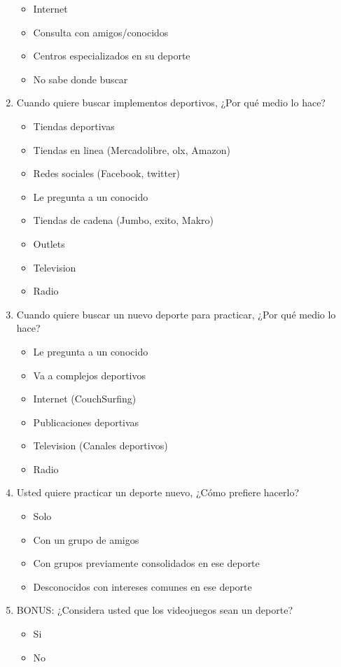 \begin{enumerate}
  \begin{itemize}
    \item Internet
    \item Consulta con amigos/conocidos
    \item Centros especializados en su deporte
    \item No sabe donde buscar
  \end{itemize}
  \item Cuando quiere buscar implementos deportivos, ¿Por qué medio lo hace?
  \begin{itemize}
    \item Tiendas deportivas
    \item Tiendas en linea (Mercadolibre, olx, Amazon)
    \item Redes sociales (Facebook, twitter)
    \item Le pregunta a un conocido
    \item Tiendas de cadena (Jumbo, exito, Makro)
    \item Outlets
    \item Television
    \item Radio
  \end{itemize}
  \item Cuando quiere buscar un nuevo deporte para practicar, ¿Por qué medio lo hace?
  \begin{itemize}
    \item Le pregunta a un conocido
    \item Va a complejos deportivos
    \item Internet (CouchSurfing)
    \item Publicaciones deportivas
    \item Television (Canales deportivos)
    \item Radio
  \end{itemize}
  \item Usted quiere practicar un deporte nuevo, ¿Cómo prefiere hacerlo?
  \begin{itemize}
    \item Solo
    \item Con un grupo de amigos
    \item Con grupos previamente consolidados en ese deporte
    \item Desconocidos con intereses comunes en ese deporte
  \end{itemize}
  \item BONUS: ¿Considera usted que los videojuegos sean un deporte?
  \begin{itemize}
    \item Si
    \item No
  \end{itemize}
\end{enumerate}


